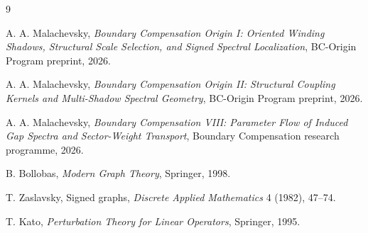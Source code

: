 \documentclass[11pt]{article}
\begin{document}
\begin{thebibliography}{9}

A. A. Malachevsky,
\emph{Boundary Compensation Origin I: Oriented Winding Shadows, Structural Scale Selection, and Signed Spectral Localization},
BC-Origin Program preprint, 2026.

A. A. Malachevsky,
\emph{Boundary Compensation Origin II: Structural Coupling Kernels and Multi-Shadow Spectral Geometry},
BC-Origin Program preprint, 2026.

A. A. Malachevsky,
\emph{Boundary Compensation VIII: Parameter Flow of Induced Gap Spectra and Sector-Weight Transport},
Boundary Compensation research programme, 2026.

B. Bollobas,
\emph{Modern Graph Theory},
Springer, 1998.

T. Zaslavsky,
Signed graphs,
\emph{Discrete Applied Mathematics} 4 (1982), 47--74.

T. Kato,
\emph{Perturbation Theory for Linear Operators},
Springer, 1995.

\end{thebibliography}
\end{document}

